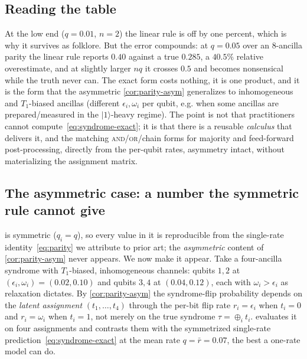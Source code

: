 \documentclass[a4paper,onecolumn,unpublished,nopdfoutputerror,allowtoday]{quantumarticle}
\numberwithin{equation}{section}
\theoremstyle{plain}
\theoremstyle{definition}
\theoremstyle{remark}
\newcommand{\eps}{\epsilon}
\newcommand{\ket}[1]{\lvert #1 \rangle}
\newcommand{\bxor}{\oplus}
\begin{document}
\subsection{Reading the table}

At the low end ($q=0.01$, $n=2$) the linear rule is off by one percent, which is
why it survives as folklore. But the error compounds: at $q=0.05$ over an
$8$-ancilla parity the linear rule reports $0.40$ against a true $0.285$, a
$40.5\%$ relative overestimate, and at slightly larger $nq$ it crosses $0.5$ and
becomes nonsensical while the truth never can. The exact form costs nothing, it
is one product, and it is the form that the asymmetric \cref{cor:parity-asym}
generalizes to inhomogeneous and $T_1$-biased ancillas (different $\eps_i,\omega_i$
per qubit, e.g. when some ancillas are prepared/measured in the $\ket{1}$-heavy
regime). The point is not that practitioners cannot compute~\eqref{eq:syndrome-exact};
it is that there is a reusable \emph{calculus} that delivers it, and the
matching \textsc{and}/\textsc{or}/chain forms for majority and feed-forward
post-processing, directly from the per-qubit rates, asymmetry intact, without
materializing the assignment matrix.

\subsection{The asymmetric case: a number the symmetric rule cannot give}
\label{sec:worked-asym}

 is symmetric ($q_i=q$), so every value in it is reproducible
from the single-rate identity~\eqref{eq:parity} we attribute to prior art; the
\emph{asymmetric} content of \cref{cor:parity-asym} never appears. We now make it
appear. Take a four-ancilla syndrome with $T_1$-biased, inhomogeneous channels:
qubits $1,2$ at $(\eps_i,\omega_i)=(0.02,0.10)$ and qubits $3,4$ at $(0.04,0.12)$,
each with $\omega_i>\eps_i$ as relaxation dictates. By \cref{cor:parity-asym} the
syndrome-flip probability depends on the \emph{latent assignment}
$(t_1,\dots,t_4)$ through the per-bit flip rate $r_i=\eps_i$ when $t_i=0$ and
$r_i=\omega_i$ when $t_i=1$, not merely on the true syndrome $\tau=\bxor_i t_i$.
 evaluates it on four assignments and contrasts them with
the symmetrized single-rate prediction~\eqref{eq:syndrome-exact} at the mean rate
$q=\bar r=0.07$, the best a one-rate model can do.
\end{document}
